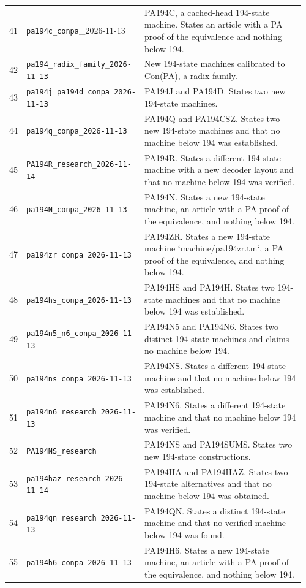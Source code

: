 \begin{longtable}{p{0.035\linewidth}p{0.31\linewidth}p{0.61\linewidth}}
41 & \nolinkurl{pa194c_conpa}\_2026-11-13 & PA194C, a cached-head 194-state machine. States an article with a PA proof of the equivalence and nothing below 194.\\[4pt]
42 & \nolinkurl{pa194_radix_family_2026-11-13} & New 194-state machines calibrated to Con(PA), a radix family.\\[4pt]
43 & \nolinkurl{pa194j_pa194d_conpa_2026-11-13} & PA194J and PA194D. States two new 194-state machines.\\[4pt]
44 & \nolinkurl{pa194q_conpa_2026-11-13} & PA194Q and PA194CSZ. States two new 194-state machines and that no machine below 194 was established.\\[4pt]
45 & \nolinkurl{PA194R_research_2026-11-14} & PA194R. States a different 194-state machine with a new decoder layout and that no machine below 194 was verified.\\[4pt]
46 & \nolinkurl{pa194N_conpa_2026-11-13} & PA194N. States a new 194-state machine, an article with a PA proof of the equivalence, and nothing below 194.\\[4pt]
47 & \nolinkurl{pa194zr_conpa_2026-11-13} & PA194ZR. States a new 194-state machine `machine/pa194zr.tm`, a PA proof of the equivalence, and nothing below 194.\\[4pt]
48 & \nolinkurl{pa194hs_conpa_2026-11-13} & PA194HS and PA194H. States two 194-state machines and that no machine below 194 was established.\\[4pt]
49 & \nolinkurl{pa194n5_n6_conpa_2026-11-13} & PA194N5 and PA194N6. States two distinct 194-state machines and claims no machine below 194.\\[4pt]
50 & \nolinkurl{pa194ns_conpa_2026-11-13} & PA194NS. States a different 194-state machine and that no machine below 194 was established.\\[4pt]
51 & \nolinkurl{pa194n6_research_2026-11-13} & PA194N6. States a different 194-state machine and that no machine below 194 was verified.\\[4pt]
52 & \nolinkurl{PA194NS_research} & PA194NS and PA194SUMS. States two new 194-state constructions.\\[4pt]
53 & \nolinkurl{pa194haz_research_2026-11-14} & PA194HA and PA194HAZ. States two 194-state alternatives and that no machine below 194 was obtained.\\[4pt]
54 & \nolinkurl{pa194qn_research_2026-11-13} & PA194QN. States a distinct 194-state machine and that no verified machine below 194 was found.\\[4pt]
55 & \nolinkurl{pa194h6_conpa_2026-11-13} & PA194H6. States a new 194-state machine, an article with a PA proof of the equivalence, and nothing below 194.\\[4pt]

\end{longtable}
